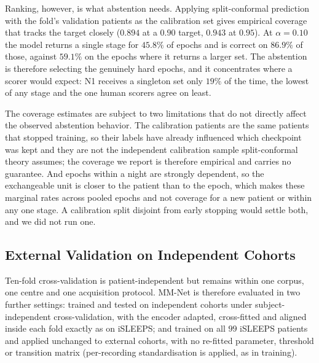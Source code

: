 \documentclass{ieeeaccess}
\begin{document}
Ranking, however, is what abstention needs. Applying split-conformal prediction with the
fold's validation patients as the calibration set gives empirical coverage that tracks the
target closely ($0.894$ at a $0.90$ target, $0.943$ at $0.95$). At $\alpha=0.10$ the model
returns a single stage for $45.8\%$ of epochs and is correct on $86.9\%$ of those, against
$59.1\%$ on the epochs where it returns a larger set. The abstention is therefore selecting the
genuinely hard epochs, and it concentrates where a scorer would
expect: N1 receives a singleton set only $19\%$ of the time, the lowest of any stage and the
one human scorers agree on least.

The coverage estimates are subject to two limitations that do not directly affect the observed abstention behavior. The
calibration patients are the same patients that stopped training, so their labels have already
influenced which checkpoint was kept and they are not the independent calibration sample
split-conformal theory assumes; the coverage we report is therefore empirical and carries no
guarantee. And epochs within a night are strongly dependent, so the exchangeable unit is
closer to the patient than to the epoch, which makes these marginal rates across pooled
epochs and not coverage for a new patient or within any one stage. A calibration split
disjoint from early stopping would settle both, and we did not run one.

\subsection{External Validation on Independent Cohorts}
\label{sec:external}
Ten-fold cross-validation is patient-independent but remains within one corpus, one centre
and one acquisition protocol. MM-Net is therefore evaluated in two further settings: trained
and tested on independent cohorts under subject-independent cross-validation, with the encoder
adapted, cross-fitted and aligned inside each fold exactly as on iSLEEPS; and trained on all
$99$ iSLEEPS patients and applied unchanged to external cohorts, with no re-fitted parameter,
threshold or transition matrix (per-recording standardisation is applied, as in training).
\end{document}
